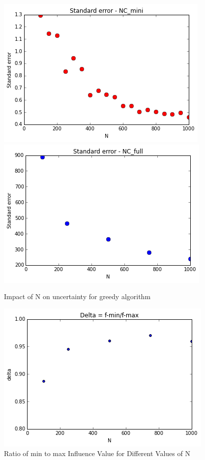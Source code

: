 \documentclass[11pt]{scrartcl} %
\begin{document}
\begin{enumerate}
\begin{figure}
\centering
\includegraphics[width=10 cm]{StandardErrorVsN}
\includegraphics[width=10 cm]{StandardErrorVsNFull}
\caption{Impact of N on uncertainty for greedy algorithm}
\label{fig:StandardError}
\end{figure}

\begin{figure}
\centering
\includegraphics[width=10 cm]{Delta}
\caption{Ratio of min to max Influence Value for Different Values of N}
\label{fig:StandardError}
\end{figure}


\end{enumerate}
\end{document}
